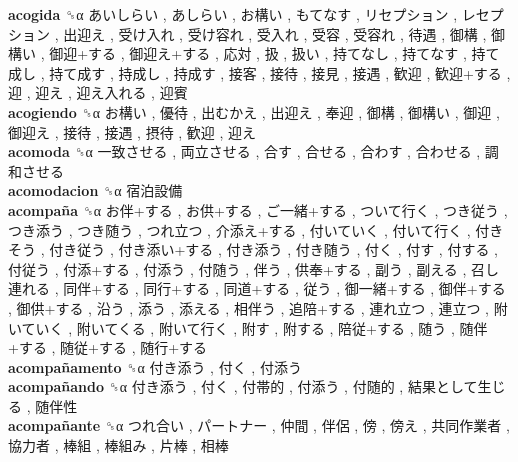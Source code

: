 \textbf{acogida} ␝α   あいしらい ,  あしらい ,  お構い ,  もてなす ,  リセプション ,  レセプション ,  出迎え ,  受け入れ ,  受け容れ ,  受入れ ,  受容 ,  受容れ ,  待遇 ,  御構 ,  御構い ,  御迎+する ,  御迎え+する ,  応対 ,  扱 ,  扱い ,  持てなし ,  持てなす ,  持て成し ,  持て成す ,  持成し ,  持成す ,  接客 ,  接待 ,  接見 ,  接遇 ,  歓迎 ,  歓迎+する ,  迎 ,  迎え ,  迎え入れる ,  迎賓   \\
\textbf{acogiendo} ␝α   お構い ,  優待 ,  出むかえ ,  出迎え ,  奉迎 ,  御構 ,  御構い ,  御迎 ,  御迎え ,  接待 ,  接遇 ,  摂待 ,  歓迎 ,  迎え   \\
\textbf{acomoda} ␝α   一致させる ,  両立させる ,  合す ,  合せる ,  合わす ,  合わせる ,  調和させる   \\
\textbf{acomodacion} ␝α   宿泊設備   \\
\textbf{acompaña} ␝α   お伴+する ,  お供+する ,  ご一緒+する ,  ついて行く ,  つき従う ,  つき添う ,  つき随う ,  つれ立つ ,  介添え+する ,  付いていく ,  付いて行く ,  付きそう ,  付き従う ,  付き添い+する ,  付き添う ,  付き随う ,  付く ,  付す ,  付する ,  付従う ,  付添+する ,  付添う ,  付随う ,  伴う ,  供奉+する ,  副う ,  副える ,  召し連れる ,  同伴+する ,  同行+する ,  同道+する ,  従う ,  御一緒+する ,  御伴+する ,  御供+する ,  沿う ,  添う ,  添える ,  相伴う ,  追陪+する ,  連れ立つ ,  連立つ ,  附いていく ,  附いてくる ,  附いて行く ,  附す ,  附する ,  陪従+する ,  随う ,  随伴+する ,  随従+する ,  随行+する   \\
\textbf{acompañamento} ␝α   付き添う ,  付く ,  付添う   \\
\textbf{acompañando} ␝α   付き添う ,  付く ,  付帯的 ,  付添う ,  付随的 ,  結果として生じる ,  随伴性   \\
\textbf{acompañante} ␝α   つれ合い ,  パートナー ,  仲間 ,  伴侶 ,  傍 ,  傍え ,  共同作業者 ,  協力者 ,  棒組 ,  棒組み ,  片棒 ,  相棒   \\
